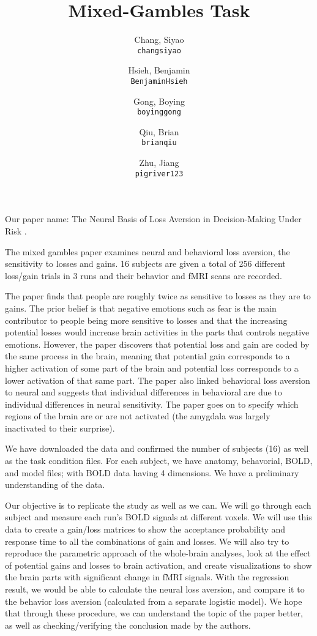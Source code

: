 \documentclass[11pt]{article}
\title{Mixed-Gambles Task}
\author{

  Chang, Siyao\\
  \texttt{changsiyao}
  \and
  Hsieh, Benjamin\\
  \texttt{BenjaminHsieh}
  \and
  Gong, Boying\\
  \texttt{boyinggong}
  \and
  Qiu, Brian\\
  \texttt{brianqiu}
  \and
  Zhu, Jiang\\
  \texttt{pigriver123}
}
\begin{document}
\maketitle

Our paper name: The Neural Basis of Loss Aversion in Decision-Making Under Risk
\cite{Tom2007LossAversion}.

The mixed gambles paper examines neural and behavioral loss aversion, the
sensitivity to losses and gains. 16 subjects are given a total of 256
different loss/gain trials in 3 runs and their behavior and fMRI scans are
recorded. 

The paper finds that people are roughly twice as sensitive to losses as they
are to gains. The prior belief is that negative emotions such as fear is the
main contributor to people being more sensitive to losses and that the
increasing potential losses would increase brain activities in the parts that
controls negative emotions. However, the paper discovers that potential loss
and gain are coded by the same process in the brain, meaning that potential
gain corresponds to a higher activation of some part of the brain and
potential loss corresponds to a lower activation of that same part. The paper
also linked behavioral loss aversion to neural and suggests that individual
differences in behavioral are due to individual differences in neural
sensitivity. The paper goes on to specify which regions of the brain are or
are not activated (the amygdala was largely inactivated to their surprise).

We have downloaded the data and confirmed the number of subjects (16) as well
as the task condition files. For each subject, we have anatomy, behavorial,
BOLD, and model files; with BOLD data having 4 dimensions. We have a preliminary 
understanding of the data. 

Our objective is to replicate the study as well as we can. We will go through
each subject and measure each run's BOLD signals at different voxels. We will
use this data to create a gain/loss matrices to show the acceptance
probability and response time to all the combinations of gain and losses. We
will also try to reproduce the parametric approach of the whole-brain
analyses, look at the effect of potential gains and losses to brain
activation, and create visualizations to show the brain parts with significant
change in fMRI signals. With the regression result, we would be able to
calculate the neural loss aversion, and compare it to the behavior loss
aversion (calculated from a separate logistic model). We hope that through
these procedure, we can understand the topic of the paper better, as well as
checking/verifying the conclusion made by the authors. 


\end{document}
